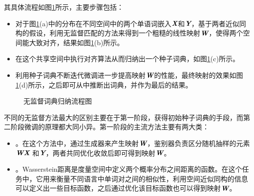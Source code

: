 \parinterval 其具体流程如图\ref{fig:16-17}所示，主要步骤包括：

\begin{itemize}
\vspace{0.5em}
\item 对于图\ref{fig:16-17}(a)中的分布在不同空间中的两个单语词嵌入$\textbf{\em X}$和$\textbf{\em Y}$，基于两者近似同构的假设，利用无监督匹配的方法来得到一个粗糙的线性映射$\textbf{\em W}$，使得两个空间能大致对齐，结果如图\ref{fig:16-17}(b)所示。
\vspace{0.5em}
\item 在这个共享空间中执行对齐算法从而归纳出一个种子词典，如图\ref{fig:16-17}(c)所示。
\vspace{0.5em}
\item 利用种子词典不断迭代微调进一步提高映射$\textbf{\em W}$的性能，最终映射的效果如图\ref{fig:16-17}(d)所示，之后即可从中推断出词典，并作为最后的结果。
\vspace{0.5em}
\end{itemize}
\begin{figure}[h]
\centering

\caption{无监督词典归纳流程图}
\label{fig:16-17}
\end{figure}

\parinterval 不同的无监督方法最大的区别主要在于第一阶段，获得初始种子词典的手段，而第二阶段微调的原理都大同小异。第一阶段的主流方法主要有两大类：

\begin{itemize}
\vspace{0.5em}
\item {\small{}}。在这个方法中，通过生成器来产生映射$\textbf{\em W}$，鉴别器负责区分随机抽样的元素$\textbf{\em W} \textbf{\em X}$ 和$\textbf{\em Y}$，两者共同优化收敛后即可得到映射$\textbf{\em W}$。
\vspace{0.5em}
\item {\small{}}。Wasserstein距离是度量空间中定义两个概率分布之间距离的函数。在这个任务中，它用来衡量不同语言中单词对之间的相似性，利用空间近似同构的信息可以定义出一些目标函数，之后通过优化该目标函数也可以得到映射$\textbf{\em W}$。
\vspace{0.5em}
\end{itemize}

